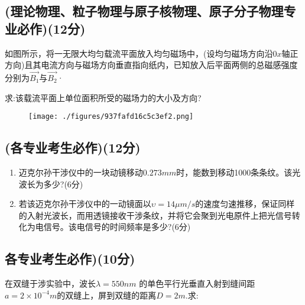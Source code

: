 \subsection{(理论物理、粒子物理与原子核物理、原子分子物理专业必作)(12分)}
如图所示，将一无限大均匀载流平面放入均匀磁场中，(设均匀磁场方向沿$0x$轴正方向)且其电流方向与磁场方向垂直指向纸内，已知放入后平面两侧的总磁感强度分别为$\vec{B_1}$与$\vec{B_2}$·

求:该载流平面上单位面积所受的磁场力的大小及方向?
\begin{figure}[ht]
\centering
\texttt{[image: ./figures/937fafd16c5c3ef2.png]}
\caption{} \label{fig_CD07_2}
\end{figure}
\subsection{(各专业考生必作)(12分)}
\begin{enumerate}
\item 迈克尔孙干涉仪中的一块动镜移动$0.273mm$时，能数到移动1000条条纹。该光波长为多少?(6分)
\item 若该迈克尔孙干涉仪中的一动镜面以$\upsilon=14\mu m/s$的速度匀速推移，保证同样的入射光波长，而用透镜接收干涉条纹，并将它会聚到光电原件上把光信号转化为电信号。该电信号的时间频率是多少?(6分)
\end{enumerate}
\subsection{各专业考生必作)(10分)}
在双缝于涉实验中，波长$\lambda=550nm$ 的单色平行光垂直入射到缝间距$a=2\times10^{-4}m$的双缝上，屏到双缝的距离$D=2m$.求:

